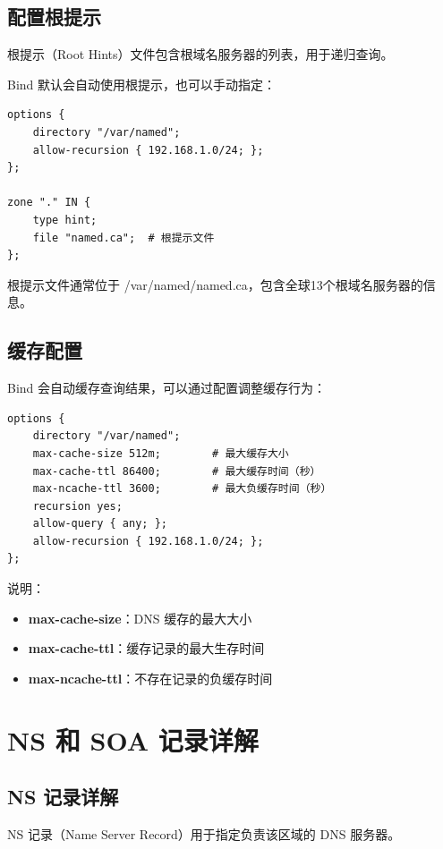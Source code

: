 \documentclass[12pt,UTF8]{ctexbook}
\begin{document}
\section{配置根提示}
\label{sec:root_hints}

根提示（Root Hints）文件包含根域名服务器的列表，用于递归查询。

Bind 默认会自动使用根提示，也可以手动指定：
\begin{verbatim}
options {
    directory "/var/named";
    allow-recursion { 192.168.1.0/24; };
};

zone "." IN {
    type hint;
    file "named.ca";  # 根提示文件
};
\end{verbatim}

根提示文件通常位于 /var/named/named.ca，包含全球13个根域名服务器的信息。

\section{缓存配置}
\label{sec:cache_config}

Bind 会自动缓存查询结果，可以通过配置调整缓存行为：

\begin{verbatim}
options {
    directory "/var/named";
    max-cache-size 512m;        # 最大缓存大小
    max-cache-ttl 86400;        # 最大缓存时间（秒）
    max-ncache-ttl 3600;        # 最大负缓存时间（秒）
    recursion yes;
    allow-query { any; };
    allow-recursion { 192.168.1.0/24; };
};
\end{verbatim}

说明：
\begin{itemize}
    \item \textbf{max-cache-size}：DNS 缓存的最大大小
    \item \textbf{max-cache-ttl}：缓存记录的最大生存时间
    \item \textbf{max-ncache-ttl}：不存在记录的负缓存时间
\end{itemize}

\chapter{NS 和 SOA 记录详解}
\label{chap:ns_soa_records}

\section{NS 记录详解}
\label{sec:ns_record_details}

NS 记录（Name Server Record）用于指定负责该区域的 DNS 服务器。
\end{document}

